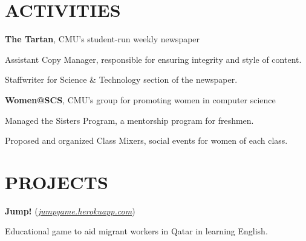\documentclass[margin, 11pt]{res} %
\begin{document}
\begin{resume}
\section{ACTIVITIES}

{\bf The Tartan}, CMU's student-run weekly newspaper

\begin{itemize} \itemsep -2pt
{\small \item Assistant Copy Manager, responsible for ensuring integrity and style of content.
\item Staffwriter for Science \& Technology section of the newspaper.}
\end{itemize}

\vspace{3pt}

{\bf Women@SCS}, CMU's group for promoting women in computer science

\begin{itemize} \itemsep -2pt
{\small \item Managed the Sisters Program, a mentorship program for freshmen.
\item Proposed and organized Class Mixers, social events for women of each class.}
\end{itemize}



\section{PROJECTS}

{\bf Jump!} {\small (\href{http://jumpgame.herokuapp.com/}{\sl jumpgame.herokuapp.com}) }

\begin{itemize} \itemsep -2pt
{\small \item Educational game to aid migrant workers in Qatar in learning English.}
\end{itemize}


\end{resume}
\end{document}
